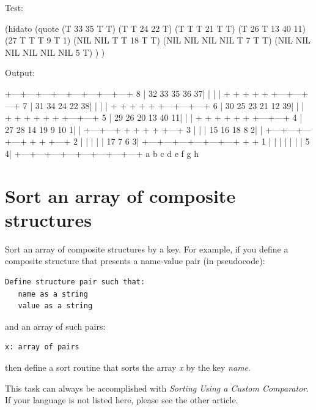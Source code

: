 \begin{wideverbatim}


Test:

(hidato
   (quote
      (T   33  35  T   T)
      (T   T   24  22  T)
      (T   T   T   21  T   T)
      (T   26  T   13  40  11)
      (27  T   T   T   9   T   1)
      (NIL NIL T   T   18  T   T)
      (NIL NIL NIL NIL T   7   T  T)
      (NIL NIL NIL NIL NIL NIL 5  T) ) )

Output:

   +---+---+---+---+---+---+---+---+
 8 | 32  33  35  36  37|   |   |   |
   +   +   +   +   +   +---+---+---+
 7 | 31  34  24  22  38|   |   |   |
   +   +   +   +   +   +---+---+---+
 6 | 30  25  23  21  12  39|   |   |
   +   +   +   +   +   +   +---+---+
 5 | 29  26  20  13  40  11|   |   |
   +   +   +   +   +   +   +---+---+
 4 | 27  28  14  19   9  10   1|   |
   +---+---+   +   +   +   +   +---+
 3 |   |   | 15  16  18   8   2|   |
   +---+---+---+---+   +   +   +---+
 2 |   |   |   |   | 17   7   6   3|
   +---+---+---+---+---+---+   +   +
 1 |   |   |   |   |   |   |  5   4|
   +---+---+---+---+---+---+---+---+
     a   b   c   d   e   f   g   h

\end{wideverbatim}

\pagebreak{}
\section*{Sort an array of composite structures}

Sort an array of composite structures by a key. For example, if you
define a composite structure that presents a name-value pair (in
pseudocode):

\begin{verbatim}
Define structure pair such that: 
   name as a string
   value as a string
\end{verbatim}

and an array of such pairs:

\begin{verbatim}
x: array of pairs
\end{verbatim}

then define a sort routine that sorts the array \emph{x} by the key
\emph{name}.

This task can always be accomplished with \emph{Sorting Using a Custom
  Comparator}. If your language is not listed here, please see the
other article.


